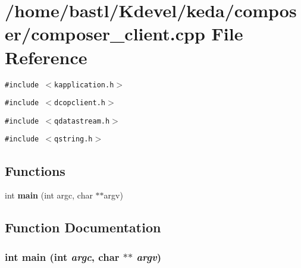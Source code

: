 \section{/home/bastl/Kdevel/keda/composer/composer\_\-client.cpp File Reference}
\label{composer__client_8cpp}
{\tt \#include $<$kapplication.h$>$}\par
{\tt \#include $<$dcopclient.h$>$}\par
{\tt \#include $<$qdatastream.h$>$}\par
{\tt \#include $<$qstring.h$>$}\par
\subsection*{Functions}
\begin{CompactItemize}
\item 
int {\bf main} (int argc, char $\ast$$\ast$argv)
\end{CompactItemize}


\subsection{Function Documentation}
\subsubsection{\setlength{\rightskip}{0pt plus 5cm}int main (int {\em argc}, char $\ast$$\ast$ {\em argv})}\label{composer__client_8cpp_30c4c19ff69d905e8e4c750b3af23485}


